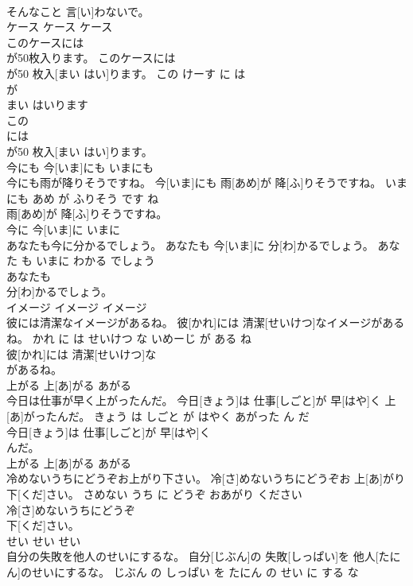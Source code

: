 \documentclass[8pt]{extreport}
\begin{document}
\begin{CJK}{UTF8}{min}
\\	そんなこと 言[い]わないで。			
\\	ケース	ケース	ケース	
\\	このケースには
\\	が50枚入ります。	このケースには
\\	が50 枚入[まい はい]ります。	この けーす に は 
\\	が 
\\	まい はいります	
\\	この
\\	には
\\	が50 枚入[まい はい]ります。			
\\	今にも	今[いま]にも	いまにも	
\\	今にも雨が降りそうですね。	今[いま]にも 雨[あめ]が 降[ふ]りそうですね。	いまにも あめ が ふりそう です ね	
\\	雨[あめ]が 降[ふ]りそうですね。			
\\	今に	今[いま]に	いまに	
\\	あなたも今に分かるでしょう。	あなたも 今[いま]に 分[わ]かるでしょう。	あなた も いまに わかる でしょう	
\\	あなたも
\\	分[わ]かるでしょう。			
\\	イメージ	イメージ	イメージ	
\\	彼には清潔なイメージがあるね。	彼[かれ]には 清潔[せいけつ]なイメージがあるね。	かれ に は せいけつ な いめーじ が ある ね	
\\	彼[かれ]には 清潔[せいけつ]な
\\	があるね。			
\\	上がる	上[あ]がる	あがる	
\\	今日は仕事が早く上がったんだ。	今日[きょう]は 仕事[しごと]が 早[はや]く 上[あ]がったんだ。	きょう は しごと が はやく あがった ん だ	
\\	今日[きょう]は 仕事[しごと]が 早[はや]く
\\	んだ。			
\\	上がる	上[あ]がる	あがる	
\\	冷めないうちにどうぞお上がり下さい。	冷[さ]めないうちにどうぞお 上[あ]がり 下[くだ]さい。	さめない うち に どうぞ おあがり ください	
\\	冷[さ]めないうちにどうぞ
\\	下[くだ]さい。			
\\	せい	せい	せい	
\\	自分の失敗を他人のせいにするな。	自分[じぶん]の 失敗[しっぱい]を 他人[たにん]のせいにするな。	じぶん の しっぱい を たにん の せい に する な	

\end{CJK}
\end{document}
